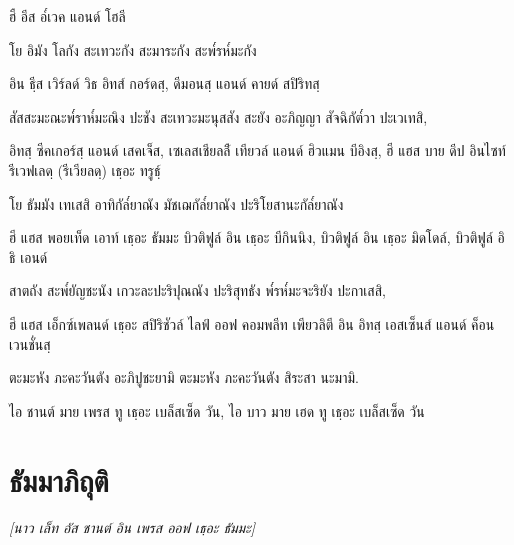 \begin{english}
ฮื อีส อ๎เวค แอนด์ โฮลี
\end{english}

โย อิมัง โลกัง สะเทวะกัง สะมาระกัง สะพ๎รห๎มะกัง

\begin{english}
อิน ธฺีส เวิร์ลด์ วิธ อิทส์ กอร์ดสฺ, ดีมอนสฺ แอนด์ คายด์ สปิริทสฺ
\end{english}

สัสสะมะณะพ๎ราห๎มะณิง ปะชัง สะเทวะมะนุสสัง สะยัง อะภิญญา สัจฉิกัต๎วา ปะเวเทสิ,

\begin{english}
อิทสฺ ซีคเกอร์สฺ แอนด์ เสคเจ็ส, เซเลสเชียลล์ื เทียวล์ แอนด์ ฮิวแมน
	บีอิงสฺ, ฮี แฮส บาย ดีป อินไซท์   รีเวฟเลดฺ (รีเวียลดฺ)  เธฺอะ ทรูธฺ์
\end{english}

โย ธัมมัง เทเสสิ อาทิกัล๎ยาณัง มัชเฌกัล๎ยาณัง ปะริโยสานะกัล๎ยาณัง

\begin{english}
ฮี แฮส พอยเท็ด เอาท์ เธฺอะ ธัมมะ บิวติฟูล์ อิน เธฺอะ บีกินนิง,
บิวติฟูล์ อิน เธฺอะ มิดโดล์, บิวติฟูล์ อิ ธิ เอนด์
\end{english}

สาตถัง สะพ๎ยัญชะนัง เกวะละปะริปุณณัง ปะริสุทธัง พ๎รห๎มะจะริยัง ปะกาเสสิ,

\begin{english}
ฮี แฮส เอ็กซ์เพลนด์ เธฺอะ สปิริชัวล์ ไลฟ์ ออฟ คอมพลีท เพียวลิตี อิน อิทสฺ เอสเซ็นส์ แอนด์ ค็อนเวนชั่นสฺ
\end{english}

ตะมะหัง ภะคะวันตัง อะภิปูชะยามิ ตะมะหัง ภะคะวันตัง สิระสา นะมามิ.

\begin{english}
ไอ ชานต์ มาย เพรส ทู เธฺอะ เบล็สเซ็ด วัน, ไอ บาว มาย เฮด ทู เธฺอะ เบล็สเซ็ด วัน
\end{english}


\chapter{ธัมมาภิถุติ}

\begin{leader}
\end{leader}

\begin{leader}
\textit{[นาว เล็ท อัส ชานต์ อิน เพรส ออฟ เธฺอะ ธัมมะ]}
\end{leader}

